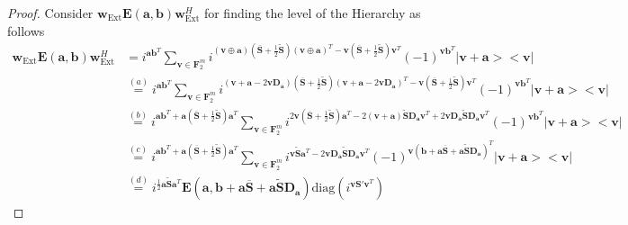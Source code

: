 \documentclass[lettersize,journal,onecolumn]{IEEEtran}
\begin{document}
\begin{proof}
	Consider $\mathbf{w}_{\text{Ext}} \mathbf{E}\left(\mathbf{a,b}\right) \mathbf{w}_{\text{Ext}}^H$ for finding the level of the Hierarchy as follows
	\begin{align}
		\mathbf{w}_{\text{Ext}} \mathbf{E}\left(\mathbf{a, b}\right) \mathbf{w}_{\text{Ext}}^H &=i^{\mathbf{a b}^T} \sum_{\mathbf{v}\in \mathbf{F}_2^m}{i^{\left(\mathbf{v}\oplus \mathbf{a}\right)\left(\overline{\mathbf{S}}+\frac{1}{2}\widetilde{\mathbf{S}}\right)\left(\mathbf{v}\oplus \mathbf{a}\right)^T-\mathbf{v}\left(\overline{\mathbf{S}}+\frac{1}{2}\widetilde{\mathbf{S}}\right)\mathbf{v}^T} (-1)^{\mathbf{v b}^T} |\mathbf{v+a}><\mathbf{v}|} \nonumber \\
		&\stackrel{(a)}{=}i^{\mathbf{a b}^T} \sum_{\mathbf{v} \in \mathbf{F}_2^m}{i^{\left(\mathbf{v}+ \mathbf{a}-2\mathbf{v}\mathbf{D}_\mathbf{a}\right)\left(\overline{\mathbf{S}}+\frac{1}{2}\widetilde{\mathbf{S}}\right)\left(\mathbf{v}+ \mathbf{a}-2\mathbf{v}\mathbf{D}_\mathbf{a}\right)^T-\mathbf{v}\left(\overline{\mathbf{S}}+\frac{1}{2}\widetilde{\mathbf{S}}\right)\mathbf{v}^T} (-1)^{\mathbf{v b}^T} |\mathbf{v+a}><\mathbf{v}|} \nonumber \\
		&\stackrel{(b)}{=} i^{\mathbf{a b}^T+\mathbf{a} \left(\overline{\mathbf{S}}+\frac{1}{2}\widetilde{\mathbf{S}}\right)\mathbf{a}^T}\sum_{\mathbf{v}\in \mathbf{F}_2^m}{i^{2\mathbf{v} \left(\overline{\mathbf{S}}+\frac{1}{2}\widetilde{\mathbf{S}}\right)\mathbf{a}^T-2\left(\mathbf{v+a}\right) \widetilde{\mathbf{S}} \mathbf{D}_\mathbf{a} \mathbf{v}^T+2\mathbf{v}\mathbf{D}_\mathbf{a} \widetilde{\mathbf{S}} \mathbf{D}_\mathbf{a} \mathbf{v}^T  } (-1)^{\mathbf{v b}^T} |\mathbf{v+a}><\mathbf{v}|} \nonumber \\
		&\stackrel{(c)}{=} i^{\mathbf{a b}^T+\mathbf{a} \left(\overline{\mathbf{S}}+\frac{1}{2}\widetilde{\mathbf{S}}\right)\mathbf{a}^T}\sum_{\mathbf{v}\in \mathbf{F}_2^m}{i^{\mathbf{v} \widetilde{\mathbf{S}} \mathbf{a}^T -2\mathbf{v}\mathbf{D}_{\mathbf{\overline{a}}}\widetilde{\mathbf{S}}\mathbf{D}_\mathbf{a} \mathbf{v}^T} (-1)^{\mathbf{v}\left(\mathbf{b+a}\overline{\mathbf{S}}+\mathbf{a}\widetilde{\mathbf{S}}\mathbf{D}_\mathbf{a}\right)^T} |\mathbf{v+a}><\mathbf{v}|} \nonumber \\
		&\stackrel{(d)}{=} i^{\frac{1}{2}\mathbf{a} \widetilde{\mathbf{S}}\mathbf{a}^T} \mathbf{E}\left(\mathbf{a, b+a}\overline{\mathbf{S}}+\mathbf{a}\widetilde{\mathbf{S}}\mathbf{D}_\mathbf{a}\right) \text{diag}\left(i^{\mathbf{v}\mathbf{S}'\mathbf{v}^T}\right) \label{HierarchLevExt1}
	\end{align} 

\end{proof}
\end{document}
